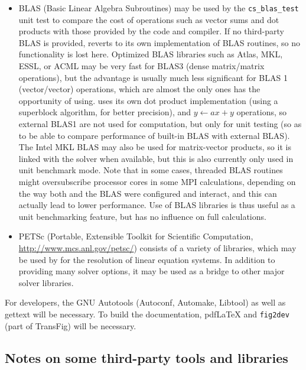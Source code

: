 \documentclass[a4paper,10pt,twoside]{csshortdoc}
\begin{document}
\begin{itemize}
\item BLAS (Basic Linear Algebra Subroutines) may be used by the
      \texttt{cs\_blas\_test} unit test to compare the cost of operations
      such as vector sums and dot products with those provided
      by the code and compiler.
      If no third-party BLAS is provided, \CS reverts to its own
      implementation of BLAS routines, so no functionality is lost here.
      Optimized BLAS libraries such as Atlas, MKL, ESSL, or ACML may be very
      fast for BLAS3 (dense matrix/matrix operations), but the advantage is
      usually much less significant for BLAS 1 (vector/vector) operations, which
      are almost the only ones \CS has the opportunity of using.
      \CS uses its own dot product implementation (using a superblock algorithm,
      for better precision), and $y \leftarrow ax+y$ operations, so external
      BLAS1 are not used for computation, but only for unit testing (so as
      to be able to compare performance of built-in BLAS with external BLAS).
      The Intel MKL BLAS may also be used for matrix-vector products, so it
      is linked with the solver when available, but this is also currently only
      used in unit benchmark mode.
      Note that in some cases, threaded BLAS routines might oversubscribe
      processor cores in some MPI calculations, depending on the way both
      \CS and the BLAS were configured and interact, and this can actually
      lead to lower performance.
      Use of BLAS libraries is thus useful as a unit benchmarking feature,
      but has no influence on full calculations.

\item PETSc (Portable, Extensible Toolkit for Scientific Computation,
      \url{http://www.mcs.anl.gov/petsc/}) consists  of a variety of libraries,
      which may be used by \CS for the resolution of linear equation systems.
      In addition to providing many solver options, it may be used as a bridge
      to other major solver libraries.

\end{itemize}

For developers, the GNU Autotools (Autoconf, Automake, Libtool) as
well as gettext will be necessary. To build the documentation,
pdf\LaTeX{} and \texttt{fig2dev} (part of TransFig) will be necessary.

\subsection{Notes on some third-party tools and libraries}
\end{document}
